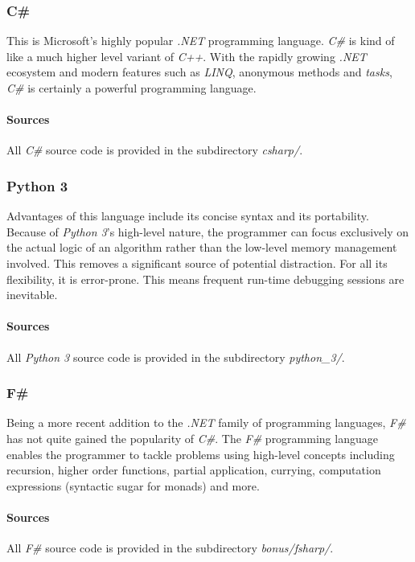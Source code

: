 \documentclass{article}
\begin{document}
\subsubsection{C\#}
This is Microsoft's highly popular\cite{popularity-index} {\em .NET} programming language. {\em C\#} is kind of like a much
higher level variant of {\em C++}. With the rapidly growing {\em .NET} ecosystem and modern features such as {\em LINQ},
anonymous methods and {\em tasks}, {\em C\#} is certainly a powerful programming language.

\paragraph{Sources}
All {\em C\#} source code is provided in the subdirectory {\em csharp/}.

\subsubsection{Python 3}
Advantages of this language include its concise syntax and its portability. Because of {\em Python 3}'s high-level nature,
the programmer can focus exclusively on the actual logic of an algorithm rather than the low-level memory management involved.
This removes a significant source of potential distraction. For all its flexibility, it is error-prone. This means frequent
run-time debugging sessions are inevitable.

\paragraph{Sources}
All {\em Python 3} source code is provided in the subdirectory {\em python\_3/}.

\subsubsection{F\#}
Being a more recent addition to the {\em .NET} family of programming languages, {\em F\#} has not quite gained the popularity of
{\em C\#}. The {\em F\#} programming language enables the programmer to tackle problems using high-level concepts including
recursion, higher order functions, partial application, currying, computation expressions (syntactic sugar for monads) and more.

\paragraph{Sources}
All {\em F\#} source code is provided in the subdirectory {\em bonus/fsharp/}.
\end{document}
